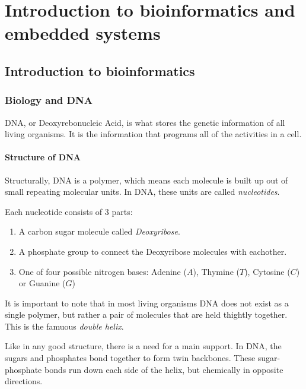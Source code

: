 
\chapter{Introduction to bioinformatics and embedded systems}

\section{Introduction to bioinformatics}

\subsection{Biology and DNA}

DNA, or Deoxyrebonucleic Acid, is what stores the genetic information of all living organisms. It is the information that programs all of the activities in a cell.

\subsubsection{Structure of DNA}

Structurally, DNA is a polymer, which means each molecule is built up out of small repeating molecular units. In DNA, these units are called \emph{nucleotides}.

Each nucleotide consists of 3 parts:

\begin{enumerate}
	\item A carbon sugar molecule called \emph{Deoxyribose}. 
	\item A phosphate group to connect the Deoxyribose molecules with eachother. 
	\item One of four possible nitrogen bases: Adenine ($A$), Thymine ($T$), Cytosine ($C$) or Guanine ($G$)
\end{enumerate}

It is important to note that in most living organisms DNA does not exist as a single polymer, but rather a pair of molecules that are held thightly together. This is the famuous \emph{double helix}.

Like in any good structure, there is a need for a main support. In DNA, the sugars and phosphates bond together to form twin backbones. These sugar-phosphate bonds run down each side of the helix, but chemically in opposite directions. 

